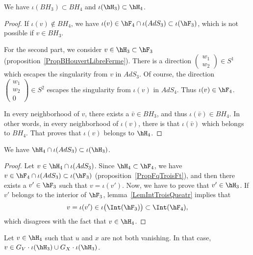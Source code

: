 \begin{corollary}		\label{CorBHBHHHHH}
	We have $\iota(BH_3)\subset BH_4$ and $\iota(\hH_3)\subset \hH_4$.
\end{corollary}

\begin{proof}
	If $\iota(v)\notin BH_4$, we have $\iota(v)\in \hF_4\cap\iota(AdS_3)\subset\iota(\hF_3)$, which is not possible if $v\in BH_3$.

	For the second part, we consider $v\in\hH_3\subset\hF_3$ (proposition~\ref{PropBHouvertLibreFerme}). There is a direction $\begin{pmatrix}
		w_1	\\
		w_2
	\end{pmatrix}\in S^1$ which escapes the singularity from $v$ in $AdS_3$. Of course, the direction $\begin{pmatrix}
		w_1	\\
		w_2	\\
		0
	\end{pmatrix}\in S^2$ escapes the singularity from $\iota(v)$ in $AdS_4$. Thus $\iota(v)\in\hF_4$.

	In every neighborhood of $v$, there exists a $\bar v\in BH_3$, and thus $\iota(\bar v)\in BH_4$. In other words, in every neighborhood of $\iota(v)$, there is that $\iota(\bar v)$ which belongs to $BH_4$. That proves that $\iota(v)$ belongs to $\hH_4$.
\end{proof}

\begin{lemma}		\label{LemHinteridansH}
	We have $\hH_4\cap\iota(AdS_3)\subset\iota(\hH_3)$.
\end{lemma}

\begin{proof}
	Let $v\in\hH_4\cap\iota(AdS_3)$. Since $\hH_4\subset\hF_4$, we have $v\in\hF_4\cap\iota(AdS_3)\subset\iota(\hF_3)$ (proposition~\ref{PropFqTroisFt}), and then there exists a $v'\in\hF_3$ such that $v=\iota(v')$. Now, we have to prove that $v'\in\hH_3$. If $v'$ belongs to the interior of $\hF_3$, lemma~\ref{LemIntTroisQueatr} implies that
	\begin{equation}
		v=\iota(v')\in\iota\big( \Int(\hF_3) \big)\subset\Int(\hF_4),
	\end{equation}
	which disagrees with the fact that $v\in\hH_4$.
\end{proof}

\begin{lemma}		\label{LemPresqueHOrQadp}
Let $v\in\hH_4$ such that $u$ and $x$ are not both vanishing. In that case, $v\in G_V\cdot \iota(\hH_3)\cup G_X\cdot\iota(\hH_3)$.
\end{lemma}


